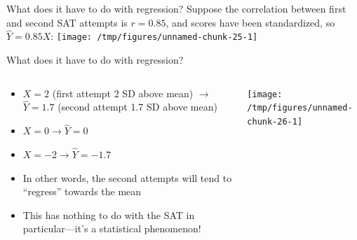 \documentclass{beamer}\usepackage[]{graphicx}\usepackage[]{color}
\newenvironment{knitrout}{}{} %
\begin{document}
\begin{darkframes}
    \begin{frame}{What does it have to do with regression?}
      Suppose the correlation between first and second SAT attempts is $r=0.85$, and scores have been standardized, so $\hat Y=0.85 X$:
\begin{knitrout}
\color{fgcolor}
\texttt{[image: /tmp/figures/unnamed-chunk-25-1]} 

\end{knitrout}
    \end{frame}

    \begin{frame}{What does it have to do with regression?}
      \begin{columns}[onlytextwidth]
        \begin{column}{0.5\textwidth}
          \begin{itemize}[<+->]
            \item $X=2$ (first attempt 2 SD above mean) $\longrightarrow$ $\hat Y = 1.7$ (second attempt 1.7 SD above mean)
            \item $X=0 \longrightarrow \hat Y = 0$ 
            \item $X=-2 \longrightarrow \hat Y = -1.7$
            \item In other words, the second attempts will tend to ``regress'' towards the mean
            \item This has nothing to do with the SAT in particular---it's a statistical phenomenon!
          \end{itemize}
        \end{column}
        \begin{column}{0.5\textwidth}
\begin{knitrout}
\color{fgcolor}
\texttt{[image: /tmp/figures/unnamed-chunk-26-1]} 

\end{knitrout}
        \end{column}
      \end{columns}
    \end{frame}

  \end{darkframes}
\end{document}
